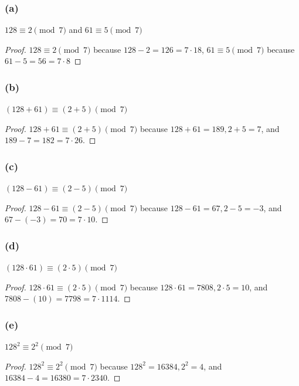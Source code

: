 \documentclass[14pt]{extarticle}
\begin{document}
\subsubsection{(a)}
\(128 \equiv 2 \pmod 7\) and \(61 \equiv 5 \pmod 7\)

\begin{proof}
\(128 \equiv 2 \pmod 7\) because \(128 - 2 = 126 = 7 \cdot 18\),
\(61 \equiv 5 \pmod 7\) because \(61 - 5 = 56 = 7 \cdot 8\)
\end{proof}

\subsubsection{(b)}
\((128 + 61) \equiv (2 + 5) \pmod 7\)

\begin{proof}
\(128 + 61 \equiv (2 + 5) \pmod 7\) because \(128 + 61 = 189, 2 + 5 = 7\), and \(189 - 7 = 182 = 7 \cdot 26\).
\end{proof}

\subsubsection{(c)}
\((128 - 61) \equiv (2 - 5) \pmod 7\)

\begin{proof}
\(128 - 61 \equiv (2 - 5) \pmod 7\) because \(128 - 61 = 67, 2 - 5 = -3\), and \(67 - (-3) = 70 = 7 \cdot 10\).
\end{proof}

\subsubsection{(d)}
\((128 \cdot 61) \equiv (2 \cdot 5) \pmod 7\)

\begin{proof}
\(128 \cdot 61 \equiv (2 \cdot 5) \pmod 7\) because \(128 \cdot 61 = 7808, 2 \cdot 5 = 10\), and \(7808 - (10) = 7798 
= 7 \cdot 1114\).
\end{proof}

\subsubsection{(e)}
\(128^2 \equiv 2^2 \pmod 7\)

\begin{proof}
\(128^2 \equiv 2^2 \pmod 7\) because \(128^2 = 16384, 2^2 = 4\), and \(16384 - 4 = 16380 = 7 \cdot 2340\).
\end{proof}
\end{document}
